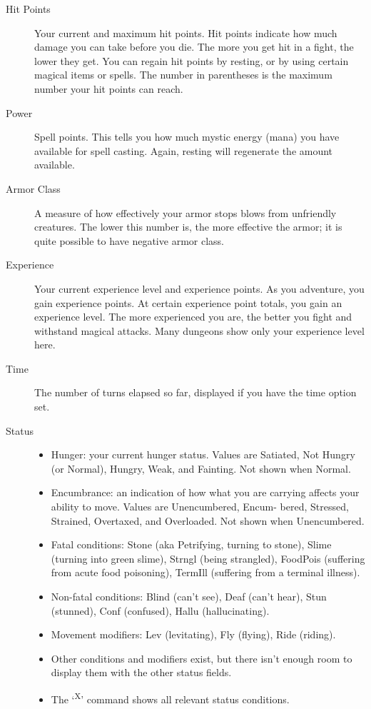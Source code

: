 \documentclass[11pt]{article}
\begin{document}
\begin{description}
\item[{Hit Points}] Your  current  and  maximum hit points.  Hit points
indicate how much damage you can take before you die.  The  more
you get  hit in a fight, the lower they get.  You can regain hit
points by resting, or by  using  certain  magical  items  or spells.
The  number  in  parentheses is the maximum number your hit points
can reach.

\item[{Power}] Spell points.  This tells you how much mystic energy
(mana) you  have  available for spell casting.  Again, resting will
regenerate the amount available.

\item[{Armor Class}] A measure of how effectively your armor stops blows
from unfriendly  creatures.  The lower this number is, the more
effective the armor; it is quite possible to have negative armor
class.

\item[{Experience}] Your current experience level and experience points.
As you adventure, you gain experience points.  At  certain
experience  point  totals, you gain an experience level.  The more
experienced you are, the better you fight and withstand magical
attacks.  Many dungeons show only your experience level here.

\item[{Time}] The number of turns elapsed so far, displayed  if  you  have
the time option set.

\item[{Status }] \begin{itemize}
\item Hunger:  your  current  hunger status.  Values are Satiated, Not
Hungry (or Normal), Hungry,  Weak,  and  Fainting.   Not shown when
Normal.
\item Encumbrance:  an indication of how what you are carrying affects
your ability to move.  Values are Unencumbered, Encum- bered,
Stressed,  Strained, Overtaxed, and Overloaded.  Not shown when
Unencumbered.
\item Fatal conditions: Stone (aka Petrifying, turning to  stone), Slime
(turning into green slime), Strngl (being strangled), FoodPois
(suffering  from  acute  food  poisoning),  TermIll (suffering from
a terminal illness).
\item Non-fatal  conditions: Blind (can't see), Deaf (can't hear), Stun
(stunned), Conf (confused), Hallu (hallucinating).
\item Movement modifiers: Lev  (levitating),  Fly  (flying),  Ride (riding).
\item Other conditions and modifiers exist, but there isn't enough room
to display them with the other status fields.
\item The `\textsuperscript{X}' command shows all relevant status conditions.
\end{itemize}
\end{description}
\end{document}
